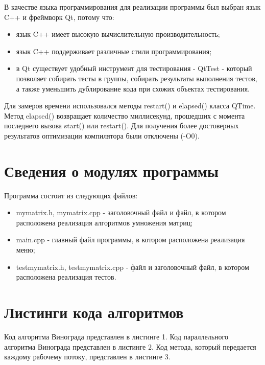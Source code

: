 \documentclass[a4paper,14pt]{report}
\begin{document}
В качестве языка программирования для реализации программы был выбран язык C++ и фреймворк Qt, потому что:
\begin{itemize}
	\item язык C++ имеет высокую вычислительную производительность;
	\item язык C++ поддерживает различные стили программирования;
	\item в Qt существует удобный инструмент для тестирования - QtTest - который позволяет собирать тесты в группы, собирать результаты выполнения тестов, а также уменьшить дублирование кода при схожих объектах тестирования.
\end{itemize}

Для замеров времени использовался методы restart() и elapsed() класса QTime. Метод elapsed() возвращает количество миллисекунд, прошедших с момента последнего вызова start() или restart(). Для получения более достоверных результатов оптимизации компилятора были отключены (-O0).

\section*{Сведения о модулях программы}

Программа состоит из следующих файлов:
\begin{itemize}
	\item mymatrix.h, mymatrix.cpp - заголовочный файл и файл, в котором расположена реализация алгоритмов умножения матриц;
	\item main.cpp - главный файл программы, в котором расположена реализация меню;
	\item testmymatrix.h, testmymatrix.cpp - файл и заголовочный файл, в котором расположена реализация тестов.
\end{itemize}


\section*{Листинги кода алгоритмов}

Код алгоритма Винограда представлен в листинге 1. Код параллельного алгоритма Винограда представлен в листинге 2. Код метода, который передается каждому рабочему потоку, представлен в листинге 3.
\end{document}
